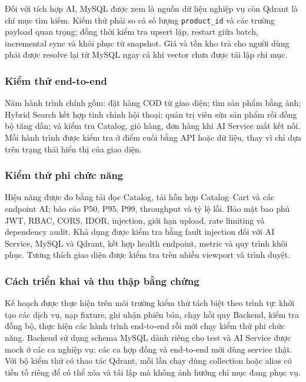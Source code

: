 Đối với tích hợp AI, MySQL được xem là nguồn dữ liệu nghiệp vụ còn Qdrant là chỉ mục tìm kiếm. Kiểm thử phải so cả số lượng \texttt{product\_id} và các trường payload quan trọng; đồng thời kiểm tra upsert lặp, restart giữa batch, incremental sync và khôi phục từ snapshot. Giá và tồn kho trả cho người dùng phải được resolve lại từ MySQL ngay cả khi vector chưa được tái lập chỉ mục.

\subsubsection{Kiểm thử end-to-end}

Năm hành trình chính gồm: đặt hàng COD từ giao diện; tìm sản phẩm bằng ảnh; Hybrid Search kết hợp tinh chỉnh hội thoại; quản trị viên sửa sản phẩm rồi đồng bộ tăng dần; và kiểm tra Catalog, giỏ hàng, đơn hàng khi AI Service mất kết nối. Mỗi hành trình được kiểm tra ở điểm cuối bằng API hoặc dữ liệu, thay vì chỉ dựa trên trạng thái hiển thị của giao diện.

\subsubsection{Kiểm thử phi chức năng}

Hiệu năng được đo bằng tải đọc Catalog, tải hỗn hợp Catalog--Cart và các endpoint AI; báo cáo P50, P95, P99, throughput và tỷ lệ lỗi. Bảo mật bao phủ JWT, RBAC, CORS, IDOR, injection, giới hạn upload, rate limiting và dependency audit. Khả dụng được kiểm tra bằng fault injection đối với AI Service, MySQL và Qdrant, kết hợp health endpoint, metric và quy trình khôi phục. Tương thích giao diện được kiểm tra trên nhiều viewport và trình duyệt.

\subsubsection{Cách triển khai và thu thập bằng chứng}

Kế hoạch được thực hiện trên môi trường kiểm thử tách biệt theo trình tự: khởi tạo các dịch vụ, nạp fixture, ghi nhận phiên bản, chạy hồi quy Backend, kiểm tra đồng bộ, thực hiện các hành trình end-to-end rồi mới chạy kiểm thử phi chức năng. Backend sử dụng schema MySQL dành riêng cho test và AI Service được mock ở các ca nghiệp vụ; các ca hợp đồng và end-to-end mới dùng service thật. Với bộ kiểm thử có thao tác Qdrant, mỗi lần chạy dùng collection hoặc alias có tiền tố riêng để có thể xóa và tái lập mà không ảnh hưởng chỉ mục đang phục vụ.


